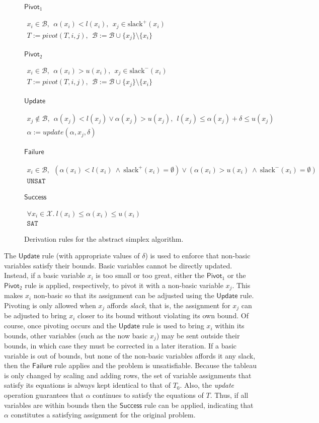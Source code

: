 \documentclass[a4paper]{llncs}
\newcommand{\basic}{\mathcal{B}}
\newcommand{\allvars}{\mathcal{X}}
\newcommand{\ub}{u}
\newcommand{\lb}{l}
\newcommand{\assignment}{\alpha{}}
\newcommand{\sat}{\texttt{SAT}}
\newcommand{\unsat}{\texttt{UNSAT}}
\newcommand{\slackPlus}{\text{slack}^+\xspace{}}
\newcommand{\slackMinus}{\text{slack}^-\xspace{}}
\newcommand{\drule}[2]{
\renewcommand{\arraystretch}{1.2}
\(\begin{array}{c}
#1 \\
\hline
#2
\end{array}\)
}
\newcommand{\rulename}[1]{\ensuremath{\mathsf{#1}}\xspace}
\newcommand{\irulename}[2]{\ensuremath{\mathsf{#1}_{#2}}\xspace}
\newcommand{\pivot}[1]{\irulename{Pivot}{#1}}
\newcommand{\failure}{\rulename{Failure}}
\newcommand{\update}{\rulename{Update}}
\newcommand{\success}{\rulename{Success}}
\newcommand{\pivotOperation}{\textit{pivot}}
\newcommand{\updateOperation}{\textit{update}}
\begin{document}
\begin{figure}[t]
\begin{centering}
\scriptsize

\pivot{1}
\drule{
x_i\in\basic,
\ \ 
\assignment (x_i) < \lb(x_i), 
\ \ 
x_j\in\slackPlus(x_i)
}
{
T := \pivotOperation{}(T,i,j), 
\ \ 
\basic := \basic\cup \{x_j\} \setminus \{x_i\}
}
\medskip

\pivot{2}
\drule{
x_i\in\basic,
\ \ 
\assignment (x_i) > \ub(x_i),
\ \
x_j\in\slackMinus(x_i)
}
{
T:=\pivotOperation{}(T,i,j), 
\ \ 
\basic := \basic\cup \{x_j\} \setminus \{x_i\}
}
\medskip 

\update
\drule{
x_j\notin\basic, 
\ \ 
\assignment(x_j) < \lb(x_j) \vee \assignment(x_j) > \ub(x_j), 
\ \ 
\lb(x_j) \leq \assignment(x_j) + \delta \leq \ub(x_j)
}
{
\assignment := \updateOperation(\assignment, x_j, \delta)
}
\medskip

\failure
\drule{
x_i\in\basic,
\ \ 
( \assignment (x_i) < \lb(x_i)
\ \wedge \
\slackPlus(x_i)=\emptyset )
\vee
( \assignment (x_i) > \ub(x_i)
\ \wedge \
\slackMinus(x_i)=\emptyset )
}
{
\unsat{}
}
\medskip

\success
\drule{
\forall x_i\in\allvars. \ 
\lb(x_i) \leq \assignment(x_i) \leq \ub(x_i)
}
{
\sat{}
}
\caption{Derivation rules for the abstract simplex algorithm.}
\label{fig:abstractSimplex}
\end{centering}
\end{figure}
%

The \update{} rule (with appropriate values of $\delta$) is used to
enforce that non-basic 
variables satisfy their bounds. Basic variables
cannot be directly updated.  Instead,
if a basic variable $x_i$ is too small or too great,
either the \pivot{1} or the \pivot{2} rule is applied,
respectively, to pivot it with a non-basic variable $x_j$.
This makes $x_i$ non-basic so that its assignment can be adjusted
using the \update{} rule.  Pivoting is only allowed when $x_j$ affords
\emph{slack}, that is, the assignment for $x_j$ can be adjusted to bring $x_i$ closer to
its bound without violating its own bound.
Of course, once pivoting occurs
and the \update rule is used to bring $x_i$ within its bounds, other variables
(such as the now basic $x_j$) may be sent outside their bounds,
in which case they must be corrected in a later iteration.
If a basic variable is out of bounds, but none of the non-basic variables
 affords it any slack,
then the \failure rule applies and the problem is unsatisfiable.
Because the tableau is only changed by scaling and adding rows, 
the set of variable assignments that satisfy its equations is always
kept identical to that of $T_0$.
Also, the \updateOperation{} operation guarantees that $\assignment{}$
continues to satisfy the equations of $T$.
Thus, if all variables are within bounds then 
the \success rule can be applied, indicating that $\alpha$ constitutes a satisfying assignment for the original problem.
\end{document}
